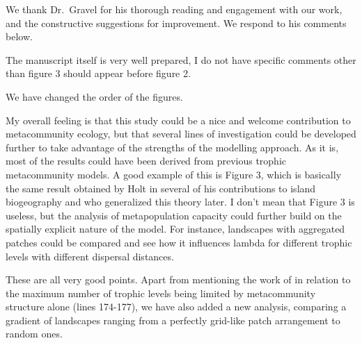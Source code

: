 \documentclass[11pt]{article}
\newcommand{\us}{\rm \setlength{\leftskip}{0.3cm} \setlength{\rightskip}{0.3cm}}
\newcommand{\them}{\it \setlength{\leftskip}{0cm} \setlength{\rightskip}{0cm}}
\begin{document}
\us

We thank Dr.~Gravel for his thorough reading and engagement with our work, and the constructive suggestions for improvement. We respond to his comments below.

\them

The manuscript itself is very well prepared, I do not have specific comments other than figure 3 should appear before figure 2.

\us

We have changed the order of the figures.

\them

My overall feeling is that this study could be a nice and welcome contribution to metacommunity ecology, but that several lines of investigation could be developed further to take advantage of the strengths of the modelling approach. As it is, most of the results could have been derived from previous trophic metacommunity models. A good example of this is Figure 3, which is basically the same result obtained by Holt in several of his contributions to island biogeography and \citet{Calcagnoetal2011} who generalized this theory later. I don't mean that Figure 3 is useless, but the analysis of metapopulation capacity could further build on the spatially explicit nature of the model. For instance, landscapes with aggregated patches could be compared and see how it influences lambda for different trophic levels with different dispersal distances. 

\us

These are all very good points. Apart from mentioning the work of \citet{Calcagnoetal2011} in relation to the maximum number of trophic levels being limited by metacommunity structure alone (lines 174-177), we have also added a new analysis, comparing a gradient of landscapes ranging from a perfectly grid-like patch arrangement to random ones.
\end{document}
